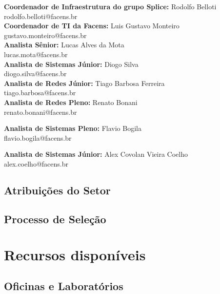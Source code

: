 \documentclass[
	12pt,				%
	oneside,			%
	a4paper,			%
	chapter=TITLE,		%
	section=TITLE,		%
	sumario=tradicional %
	english,			%
	french,				%
	spanish,			%
	brazil				%
	]{abntex2}
\begin{document}
\textbf{Coordenador de Infraestrutura do grupo Splice:} Rodolfo Belloti \\
\indent rodolfo.belloti@facens.br \\

\textbf{Coordenador de TI da Facens:} Luis Gustavo Monteiro \\
\indent gustavo.monteiro@facens.br \\

\textbf{Analista Sênior:} Lucas Alves da Mota \\
\indent lucas.mota@facens.br \\

\textbf{Analista de Sistemas Júnior:} Diogo Silva \\
\indent diogo.silva@facens.br \\

\textbf{Analista de Redes Júnior:} Tiago Barbosa Ferreira \\
\indent tiago.barbosa@facens.br \\

\textbf{Analista de Redes Pleno:} Renato Bonani \\
\indent renato.bonani@facens.br

\textbf{Analista de Sistemas Pleno:} Flavio Bogila \\
\indent flavio.bogila@facens.br

\textbf{Analista de Sistemas Júnior:} Alex Covolan Vieira Coelho \\
\indent alex.coelho@facens.br

\section{Atribuições do Setor}
\label{sec:atribsetor}

\section{Processo de Seleção}
\label{sec:procselecao}

\chapter{Recursos disponíveis}
\label{chap:chap4}

\section{Oficinas e Laboratórios}
\label{sec:oficlabs}
\end{document}
